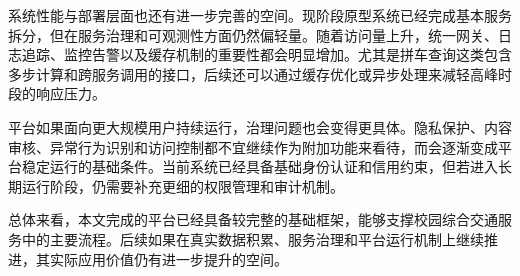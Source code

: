系统性能与部署层面也还有进一步完善的空间。现阶段原型系统已经完成基本服务拆分，但在服务治理和可观测性方面仍然偏轻量。随着访问量上升，统一网关、日志追踪、监控告警以及缓存机制的重要性都会明显增加。尤其是拼车查询这类包含多步计算和跨服务调用的接口，后续还可以通过缓存优化或异步处理来减轻高峰时段的响应压力。

平台如果面向更大规模用户持续运行，治理问题也会变得更具体。隐私保护、内容审核、异常行为识别和访问控制都不宜继续作为附加功能来看待，而会逐渐变成平台稳定运行的基础条件。当前系统已经具备基础身份认证和信用约束，但若进入长期运行阶段，仍需要补充更细的权限管理和审计机制。

总体来看，本文完成的平台已经具备较完整的基础框架，能够支撑校园综合交通服务中的主要流程。后续如果在真实数据积累、服务治理和平台运行机制上继续推进，其实际应用价值仍有进一步提升的空间。
